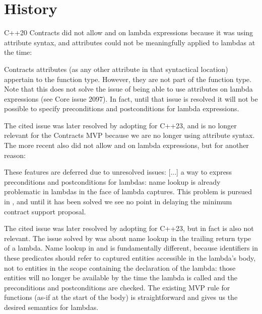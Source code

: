 \section{History}

C++20 Contracts \cite{P0542R5} did not allow  and  on lambda expressions because it was using attribute syntax, and attributes could not be meaningfully applied to lambdas at the time:

\pagebreak %

\begin{adjustwidth}{0.5cm}{0.5cm}
Contracts attributes (as any other attribute in that syntactical location) appertain to the function type. However, they are not part of the function type.
Note that this does not solve the issue of being able to use attributes on lambda expressions (see Core issue 2097). In fact, until that issue is resolved it will not be possible to specify preconditions and postconditions for lambda expressions.
\end{adjustwidth}

The cited issue was later resolved by adopting \cite{P2173R1} for C++23, and is no longer relevant for the Contracts MVP because we are no longer using attribute syntax. The more recent \cite{P2388R4} also did not allow  and  on lambda expressions, but for another reason:

\begin{adjustwidth}{0.5cm}{0.5cm}
These features are deferred due to unresolved issues: [...] a way to express preconditions and postconditions for lambdas: name lookup is already problematic in lambdas in the face of lambda captures. This problem is pursued in \cite{P2036R1}, and until it has been solved we see no point in delaying the minimum contract support proposal.
\end{adjustwidth}

The cited issue was later resolved by adopting \cite{P2036R3} for C++23, but in fact is also not relevant. The issue solved by \cite{P2036R3} was about name lookup in the trailing return type of a lambda. Name lookup in  and  is fundamentally different, because identifiers in these predicates should refer to captured entities accessible in the lambda's body, not to entities in the scope containing the declaration of the lambda: those entities will no longer be available by the time the lambda is called and the preconditions and postconditions are checked. The existing MVP rule for functions (as-if at the start of the body) is straightforward and gives us the desired semantics for lambdas.

